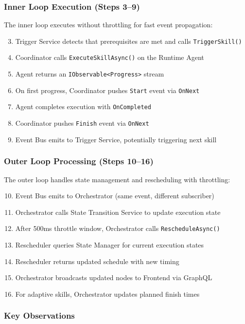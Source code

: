 \subsubsection{Inner Loop Execution (Steps 3--9)}
The inner loop executes without throttling for fast event propagation:
\begin{enumerate}
    \setcounter{enumi}{2}
    \item Trigger Service detects that prerequisites are met and calls \texttt{TriggerSkill()}
    \item Coordinator calls \texttt{ExecuteSkillAsync()} on the Runtime Agent
    \item Agent returns an \texttt{IObservable<Progress>} stream
    \item On first progress, Coordinator pushes \texttt{Start} event via \texttt{OnNext}
    \item Agent completes execution with \texttt{OnCompleted}
    \item Coordinator pushes \texttt{Finish} event via \texttt{OnNext}
    \item Event Bus emits to Trigger Service, potentially triggering next skill
\end{enumerate}

\subsubsection{Outer Loop Processing (Steps 10--16)}
The outer loop handles state management and rescheduling with throttling:
\begin{enumerate}
    \setcounter{enumi}{9}
    \item Event Bus emits to Orchestrator (same event, different subscriber)
    \item Orchestrator calls State Transition Service to update execution state
    \item After 500ms throttle window, Orchestrator calls \texttt{RescheduleAsync()}
    \item Rescheduler queries State Manager for current execution states
    \item Rescheduler returns updated schedule with new timing
    \item Orchestrator broadcasts updated nodes to Frontend via GraphQL
    \item For adaptive skills, Orchestrator updates planned finish times
\end{enumerate}

\subsubsection{Key Observations}


